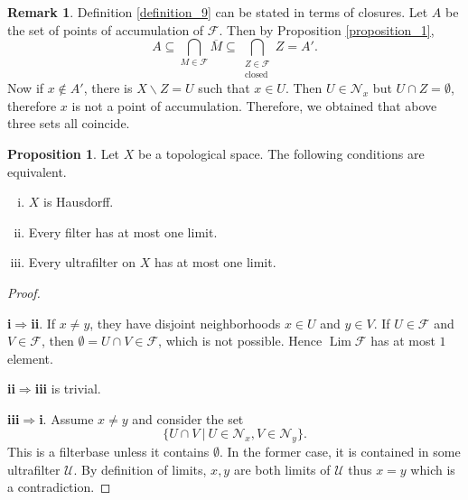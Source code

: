 \documentclass[10pt]{article}
\numberwithin{equation}{section}
\theoremstyle{definition}
\newtheorem{proposition}{Proposition}[subsection]
\newtheorem{remark}{Remark}[subsection]
\DeclareMathOperator{\Lim}{Lim}
\newcommand{\F}[0]{\mathcal{F}}
\newcommand{\U}[0]{\mathcal{U}}
\newcommand{\sep}[0]{\:|\:}
\newcommand{\Nfil}[0]{\mathcal{N}}
\begin{document}
\begin{remark}
    \label{fact_13}
    Definition \ref{definition_9} can be stated in terms of closures.
    Let $A$ be the set of points of accumulation of $\F$. Then by Proposition \ref{proposition_1},
    \begin{equation*}
    A\subseteq \bigcap_{M\in\F}\overline{M} \subseteq \bigcap_{\substack{Z\in\F\\\text{closed}}}Z=A'.
    \end{equation*}
    Now if $x\not\in A'$, there is $X\backslash Z = U$ such that $x\in U$. Then $U\in\Nfil_x$ but $U\cap Z=\emptyset$, therefore $x$ is not a point of accumulation. Therefore, we obtained that above three sets all coincide.
\end{remark}
\begin{proposition}
    \label{proposition_2}
    Let $X$ be a topological space. The following conditions are equivalent.
    \begin{enumerate}[i.]
        \item $X$ is Hausdorff.
        \item Every filter has at most one limit.
        \item Every ultrafilter on $X$ has at most one limit.
    \end{enumerate}
\end{proposition}
\begin{proof}$\:$
    \par\textbf{i}$\Rightarrow$\textbf{ii}. If $x\not=y$, they have disjoint neighborhoods $x\in U$ and $y\in V$. If $U\in\F$ and $V\in\F$, then $\emptyset=U\cap V\in\F$, which is not possible. Hence $\Lim\F$ has at most $1$ element.
    \par\textbf{ii}$\Rightarrow$\textbf{iii} is trivial.
    \par\textbf{iii}$\Rightarrow$\textbf{i}. Assume $x\not=y$ and consider the set
    \begin{equation*}
    \{U\cap V\sep U\in\Nfil_x,V\in\Nfil_y\}.
    \end{equation*}
    This is a filterbase unless it contains $\emptyset$. In the former case, it is contained in some ultrafilter $\U$. By definition of limits, $x,y$ are both limits of $\U$ thus $x=y$ which is a contradiction.
\end{proof}
\end{document}
